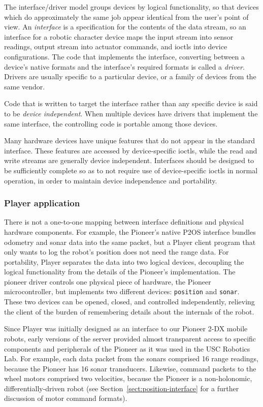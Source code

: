 \documentclass[letterpaper, 10 pt, conference]{iros03}
\begin{document}
The interface/driver model groups devices by logical functionality, so
that devices which do approximately the same job appear identical from
the user's point of view. An {\em interface} is a specification for
the contents of the data stream, so an interface for a robotic
character device maps the input stream into sensor readings, output
stream into actuator commands, and ioctls into device
configurations. The code that implements the interface, converting
between a device's native formats and the interface's required formats
is called a {\em driver}. Drivers are usually specific to a particular
device, or a family of devices from the same vendor.

Code that is written to target the interface rather than any specific
device is said to be {\em device independent}. When multiple devices
have drivers that implement the same interface, the controlling code is portable
among those devices.

Many hardware devices have unique features that do not appear in the
 standard interface. These features are accessed by device-specific ioctls,
 while the read and write streams are generally device
 independent. Interfaces should be designed to be sufficiently
 complete so as to not require use of device-specific ioctls in normal
 operation, in order to maintain device independence and portability.


\subsubsection{Player application}
There is not a one-to-one mapping between interface definitions and
physical hardware components. For example, the Pioneer's native P2OS
interface bundles odometry and sonar data into the same packet, but a
Player client program that only wants to log the robot's position does
not need the range data. For portability, Player separates the data
into two logical devices, decoupling the logical functionality from
the details of the Pioneer's implementation. The pioneer driver
controls one physical piece of hardware, the Pioneer microcontroller,
but implements two different devices: {\tt position} and {\tt sonar}.
These two devices can be opened, closed, and controlled independently,
relieving the client of the burden of remembering details about the
internals of the robot.

Since Player was initially designed as an interface to our Pioneer 2-DX
mobile robots, early versions of the server provided almost transparent
access to specific components and peripherals of the Pioneer as it was
used in the USC Robotics Lab.  For example, each data packet from the
sonars comprised 16 range readings, because the Pioneer has 16 sonar
transducers.  Likewise, command packets to the wheel motors comprised two
velocities, because the Pioneer is a non-holonomic, differentially-driven
robot (see Section~\ref{sect:position-interface} for a further discussion
of motor command formats).
\end{document}
